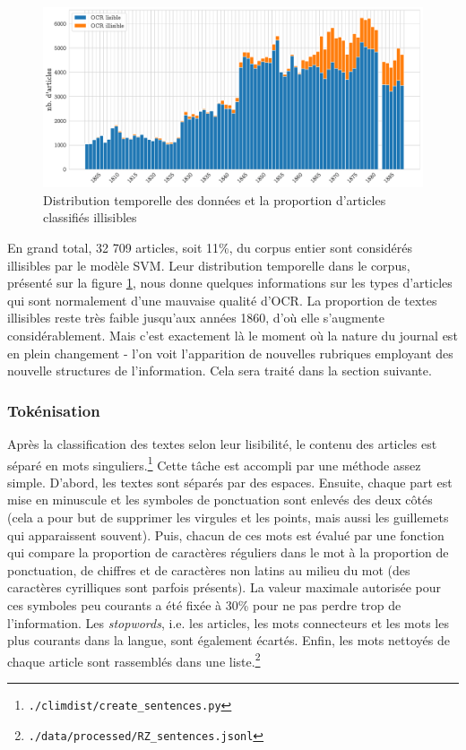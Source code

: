 \documentclass[a4paper,twoside,12pt]{article}
\begin{document}
\begin{figure}[h!]
\centering
\captionsetup{justification=centering}
\includegraphics[width=\textwidth]{images/readability_histogram.pdf}
\caption{Distribution temporelle des données et la proportion d'articles classifiés illisibles}
\label{fig:readability_hist}
\end{figure}

En grand total, 32 709 articles, soit 11\%, du corpus entier sont considérés illisibles par le modèle SVM. Leur distribution temporelle dans le corpus, présenté sur la figure \ref{fig:readability_hist}, nous donne quelques informations sur les types d'articles qui sont normalement d'une mauvaise qualité d'OCR. La proportion de textes illisibles reste très faible jusqu'aux années 1860, d'où elle s'augmente considérablement. Mais c'est exactement là le moment où la nature du journal est en plein changement - l'on voit l'apparition de nouvelles rubriques employant des nouvelle structures de l'information. Cela sera traité dans la section suivante.

\subsubsection{Tokénisation} \label{tokenisation}

Après la classification des textes selon leur lisibilité, le contenu des articles est séparé en mots singuliers.\footnote{\texttt{./climdist/create\_sentences.py}} Cette tâche est accompli par une méthode assez simple. D'abord, les textes sont séparés par des espaces. Ensuite, chaque part est mise en minuscule et les symboles de ponctuation sont enlevés des deux côtés (cela a pour but de supprimer les virgules et les points, mais aussi les guillemets qui apparaissent souvent). Puis, chacun de ces \og mots \fg{} est évalué par une fonction qui compare la proportion de caractères réguliers dans le mot à la proportion de ponctuation, de chiffres et de caractères non latins au milieu du mot (des caractères cyrilliques sont parfois présents). La valeur maximale autorisée pour ces symboles peu courants a été fixée à 30\% pour ne pas perdre trop de l'information. Les \textit{stopwords}, i.e. les articles, les mots \og connecteurs \fg{} et les mots les plus courants dans la langue, sont également écartés. Enfin, les mots nettoyés de chaque article sont rassemblés dans une liste.\footnote{\texttt{./data/processed/RZ\_sentences.jsonl}}
\end{document}
